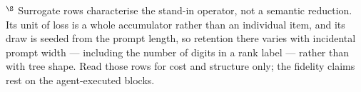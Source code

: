 
{\footnotesize $^\S$ Surrogate rows characterise the stand-in operator, not a semantic reduction. Its unit of loss is a whole accumulator rather than an individual item, and its draw is seeded from the prompt length, so retention there varies with incidental prompt width --- including the number of digits in a rank label --- rather than with tree shape. Read those rows for cost and structure only; the fidelity claims rest on the agent-executed blocks.}
